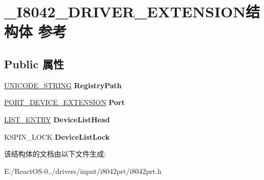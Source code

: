 \hypertarget{struct___i8042___d_r_i_v_e_r___e_x_t_e_n_s_i_o_n}{}\section{\+\_\+\+I8042\+\_\+\+D\+R\+I\+V\+E\+R\+\_\+\+E\+X\+T\+E\+N\+S\+I\+O\+N结构体 参考}
\label{struct___i8042___d_r_i_v_e_r___e_x_t_e_n_s_i_o_n}
\subsection*{Public 属性}
\begin{DoxyCompactItemize}
\item 
\mbox{\label{struct___i8042___d_r_i_v_e_r___e_x_t_e_n_s_i_o_n_ae8e534b0321cdea1594a8d2921188140}} 
\hyperlink{struct___u_n_i_c_o_d_e___s_t_r_i_n_g}{U\+N\+I\+C\+O\+D\+E\+\_\+\+S\+T\+R\+I\+NG} {\bfseries Registry\+Path}
\item 
\mbox{\label{struct___i8042___d_r_i_v_e_r___e_x_t_e_n_s_i_o_n_af695c5793cc19839b28019bf188318fb}} 
\hyperlink{struct___p_o_r_t___d_e_v_i_c_e___e_x_t_e_n_s_i_o_n}{P\+O\+R\+T\+\_\+\+D\+E\+V\+I\+C\+E\+\_\+\+E\+X\+T\+E\+N\+S\+I\+ON} {\bfseries Port}
\item 
\mbox{\label{struct___i8042___d_r_i_v_e_r___e_x_t_e_n_s_i_o_n_a608b2bb1680ffff643729377281df4be}} 
\hyperlink{struct___l_i_s_t___e_n_t_r_y}{L\+I\+S\+T\+\_\+\+E\+N\+T\+RY} {\bfseries Device\+List\+Head}
\item 
\mbox{\label{struct___i8042___d_r_i_v_e_r___e_x_t_e_n_s_i_o_n_a20451e939a9523a80824c43a83f087f1}} 
K\+S\+P\+I\+N\+\_\+\+L\+O\+CK {\bfseries Device\+List\+Lock}
\end{DoxyCompactItemize}


该结构体的文档由以下文件生成\+:\begin{DoxyCompactItemize}
\item 
E\+:/\+React\+O\+S-\/0../drivers/input/i8042prt/i8042prt.\+h\end{DoxyCompactItemize}
